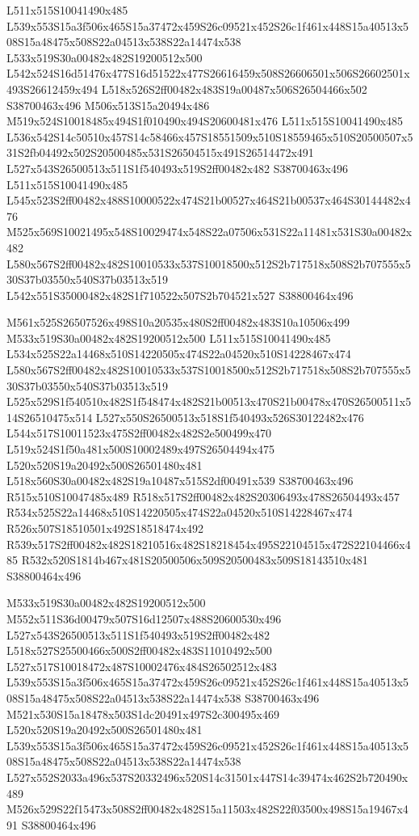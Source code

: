 \documentclass{article}
\begin{document}
\begin{multicols}{2}
L511x515S10041490x485 L539x553S15a3f506x465S15a37472x459S26c09521x452S26c1f461x448S15a40513x508S15a48475x508S22a04513x538S22a14474x538 L533x519S30a00482x482S19200512x500 L542x524S16d51476x477S16d51522x477S26616459x508S26606501x506S26602501x493S26612459x494 L518x526S2ff00482x483S19a00487x506S26504466x502 S38700463x496 M506x513S15a20494x486 M519x524S10018485x494S1f010490x494S20600481x476 L511x515S10041490x485 L536x542S14c50510x457S14c58466x457S18551509x510S18559465x510S20500507x531S2fb04492x502S20500485x531S26504515x491S26514472x491 L527x543S26500513x511S1f540493x519S2ff00482x482 S38700463x496 L511x515S10041490x485 L545x523S2ff00482x488S10000522x474S21b00527x464S21b00537x464S30144482x476 M525x569S10021495x548S10029474x548S22a07506x531S22a11481x531S30a00482x482 L580x567S2ff00482x482S10010533x537S10018500x512S2b717518x508S2b707555x530S37b03550x540S37b03513x519 L542x551S35000482x482S1f710522x507S2b704521x527 S38800464x496

M561x525S26507526x498S10a20535x480S2ff00482x483S10a10506x499 M533x519S30a00482x482S19200512x500 L511x515S10041490x485 L534x525S22a14468x510S14220505x474S22a04520x510S14228467x474 L580x567S2ff00482x482S10010533x537S10018500x512S2b717518x508S2b707555x530S37b03550x540S37b03513x519 L525x529S1f540510x482S1f548474x482S21b00513x470S21b00478x470S26500511x514S26510475x514 L527x550S26500513x518S1f540493x526S30122482x476 L544x517S10011523x475S2ff00482x482S2e500499x470 L519x524S1f50a481x500S10002489x497S26504494x475 L520x520S19a20492x500S26501480x481 L518x560S30a00482x482S19a10487x515S2df00491x539 S38700463x496 R515x510S10047485x489 R518x517S2ff00482x482S20306493x478S26504493x457 R534x525S22a14468x510S14220505x474S22a04520x510S14228467x474 R526x507S18510501x492S18518474x492 R539x517S2ff00482x482S18210516x482S18218454x495S22104515x472S22104466x485 R532x520S1814b467x481S20500506x509S20500483x509S18143510x481 S38800464x496

M533x519S30a00482x482S19200512x500 M552x511S36d00479x507S16d12507x488S20600530x496 L527x543S26500513x511S1f540493x519S2ff00482x482 L518x527S25500466x500S2ff00482x483S11010492x500 L527x517S10018472x487S10002476x484S26502512x483 L539x553S15a3f506x465S15a37472x459S26c09521x452S26c1f461x448S15a40513x508S15a48475x508S22a04513x538S22a14474x538 S38700463x496 M521x530S15a18478x503S1dc20491x497S2c300495x469 L520x520S19a20492x500S26501480x481 L539x553S15a3f506x465S15a37472x459S26c09521x452S26c1f461x448S15a40513x508S15a48475x508S22a04513x538S22a14474x538 L527x552S2033a496x537S20332496x520S14c31501x447S14c39474x462S2b720490x489 M526x529S22f15473x508S2ff00482x482S15a11503x482S22f03500x498S15a19467x491 S38800464x496


\end{multicols}
\end{document}
